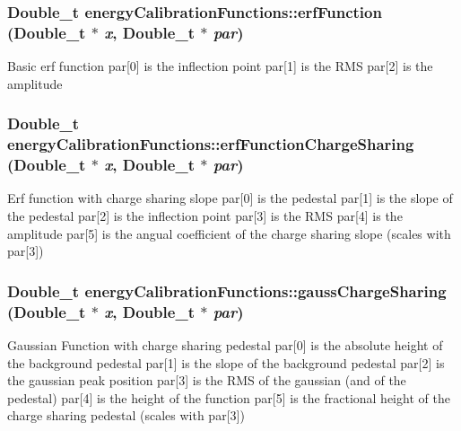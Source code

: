 \subsubsection{\setlength{\rightskip}{0pt plus 5cm}Double\_\-t energy\-Calibration\-Functions::erf\-Function (Double\_\-t $\ast$ {\em x}, Double\_\-t $\ast$ {\em par})}\label{classenergyCalibrationFunctions_2da1e3b9a10d23233256f8c2234f2457}


Basic erf function par[0] is the inflection point par[1] is the RMS par[2] is the amplitude 
\subsubsection{\setlength{\rightskip}{0pt plus 5cm}Double\_\-t energy\-Calibration\-Functions::erf\-Function\-Charge\-Sharing (Double\_\-t $\ast$ {\em x}, Double\_\-t $\ast$ {\em par})}\label{classenergyCalibrationFunctions_8d1b3d0f8b30423dad56d8ce5323a4a8}


Erf function with charge sharing slope par[0] is the pedestal par[1] is the slope of the pedestal par[2] is the inflection point par[3] is the RMS par[4] is the amplitude par[5] is the angual coefficient of the charge sharing slope (scales with par[3]) 
\subsubsection{\setlength{\rightskip}{0pt plus 5cm}Double\_\-t energy\-Calibration\-Functions::gauss\-Charge\-Sharing (Double\_\-t $\ast$ {\em x}, Double\_\-t $\ast$ {\em par})}\label{classenergyCalibrationFunctions_e9582e5c46d27ad25d6139d0386698f7}


Gaussian Function with charge sharing pedestal par[0] is the absolute height of the background pedestal par[1] is the slope of the background pedestal par[2] is the gaussian peak position par[3] is the RMS of the gaussian (and of the pedestal) par[4] is the height of the function par[5] is the fractional height of the charge sharing pedestal (scales with par[3]) 
